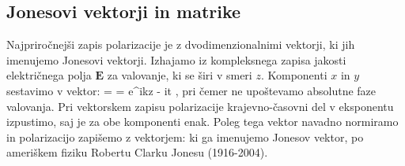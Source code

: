 \subsection*{Jonesovi vektorji in matrike}
Najpriročnejši zapis polarizacije je z dvodimenzionalnimi 
vektorji, ki jih imenujemo Jonesovi vektorji.  Izhajamo iz kompleksnega zapisa
jakosti električnega polja $\mathbf{E}$ za valovanje, ki se širi v smeri $z$.
Komponenti $x$ in $y$ sestavimo v vektor:
\beq
{} = 
= e^{ikz - i\omega t} 
\!\!,
\label{eq:03_41}
\eeq
pri čemer ne upoštevamo absolutne faze valovanja. 
Pri vektorskem zapisu polarizacije krajevno-časovni del v eksponentu izpustimo, saj 
je za obe komponenti enak. Poleg tega vektor navadno normiramo in 
polarizacijo zapišemo z vektorjem:
ki ga imenujemo Jonesov vektor, po ameriškem fiziku Robertu Clarku Jonesu (1916-2004).

